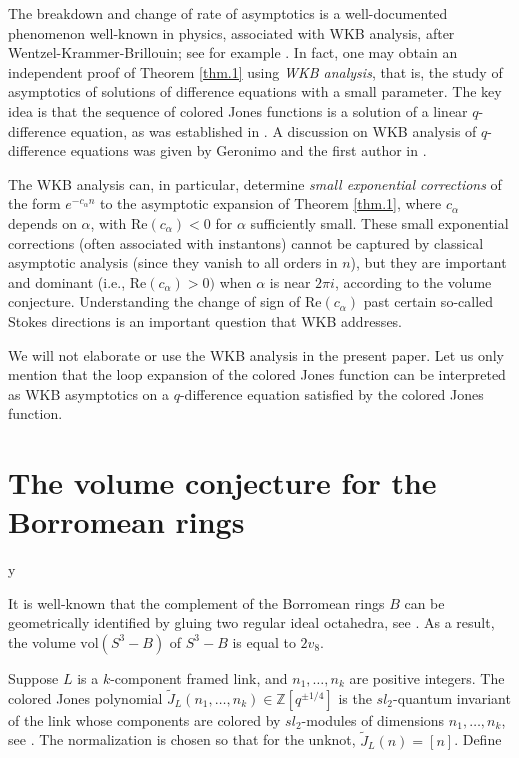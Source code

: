 \documentclass{amsart}
\theoremstyle{definition}
\def\printname#1{
    \if\draft y
        \smash{\makebox[0pt]{\hspace{-0.5in}
            \raisebox{8pt}{\tt\tiny #1}}}
    \fi
}
\def\lbl#1{\label{#1}\printname{#1}}
\def\BZ{\mathbb Z}
\def\a{\alpha}
\def\vol{\mathrm{vol}}
\begin{document}
The breakdown and change of rate of asymptotics is
a well-documented phenomenon well-known in physics, associated with WKB
analysis, after Wentzel-Krammer-Brillouin; see for example \cite{O}.
 In fact, one may obtain an independent proof of Theorem \ref{thm.1}
using {\em WKB analysis}, that is, the study of asymptotics of solutions of
difference equations with a small parameter.
The key idea is that the sequence of colored Jones
functions is a solution of a linear $q$-difference equation, as was
established in \cite{GL}. A discussion on WKB analysis of $q$-difference
equations was given by Geronimo and the first author in \cite{GG}.

The WKB analysis can, in particular, determine {\em small exponential
corrections} of the form $e^{-c_{\a} n}$ to the asymptotic expansion of
Theorem \ref{thm.1}, where $c_{\a}$ depends on $\a$, with $\text{Re}(c_{\a})
<0$ for $\a$ sufficiently small. These small exponential corrections
(often associated with instantons)
cannot be captured by classical asymptotic analysis (since they vanish
to all orders in $n$), but they are important and dominant (i.e.,
$\text{Re}(c_{\a})>0)$ when $\a$ is
near $2 \pi i$, according to the volume conjecture. Understanding the change of
sign of $\text{Re}(c_{\a})$ past certain so-called Stokes directions
is an important question that WKB addresses.

We will not elaborate or use the WKB analysis in the present paper.
Let us only mention that the loop expansion of the colored Jones function
can be interpreted as WKB asymptotics on a $q$-difference equation satisfied
by the colored Jones function.







\appendix

\section{The volume conjecture for the Borromean rings}
\lbl{sec.borromean}


It is well-known that the complement of the Borromean rings $B$ can
be geometrically identified by gluing two regular ideal octahedra,
see \cite{Th}. As a result, the volume $\vol(S^3-B)$ of $S^3-B$ is
equal to $2 v_8$.

Suppose $L$ is a $k$-component framed link,  and $n_1,\dots,n_k$ are
positive integers. The colored Jones polynomial $\tilde
J_{L}(n_1,\dots,n_k) \in \BZ[q^{\pm 1/4}]$ is the $sl_2$-quantum
invariant of the link whose components are colored by $sl_2$-modules
of dimensions $n_1,\dots,n_k$, see \cite{RT,Tu}. The normalization
is chosen so that for the unknot, $\tilde J_{L}(n) = [n]$. Define
\end{document}
